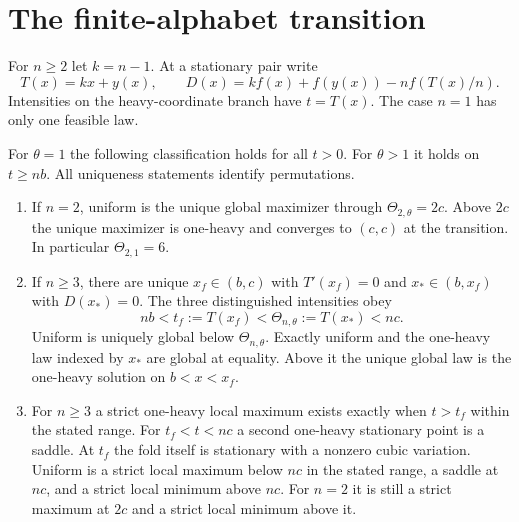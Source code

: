 \section{The finite-alphabet transition}
For $n\ge2$ let $k=n-1$. At a stationary pair write
\[
 T(x)=kx+y(x),\qquad
 D(x)=k f(x)+f(y(x))-n f(T(x)/n).
\]
Intensities on the heavy-coordinate branch have $t=T(x)$.
The case $n=1$ has only one feasible law.

\begin{theorem}\label{gtp:phase}
For $\theta=1$ the following classification holds for all $t>0$.
For $\theta>1$ it holds on $t\ge nb$. All uniqueness statements identify
permutations.
\begin{enumerate}
\item If $n=2$, uniform is the unique global maximizer through
$\Theta_{2,\theta}=2c$. Above $2c$ the unique maximizer is one-heavy and
converges to $(c,c)$ at the transition. In particular $\Theta_{2,1}=6$.
\item If $n\ge3$, there are unique $x_f\in(b,c)$ with $T'(x_f)=0$
and $x_*\in(b,x_f)$ with $D(x_*)=0$. The three distinguished intensities obey
\[
 nb<t_f:=T(x_f)<\Theta_{n,\theta}:=T(x_*)<nc .
\]
Uniform is uniquely global below $\Theta_{n,\theta}$. Exactly uniform and
the one-heavy law indexed by $x_*$ are global at equality. Above it the
unique global law is the one-heavy solution on $b<x<x_f$.
\item For $n\ge3$ a strict one-heavy local maximum exists exactly when $t>t_f$
within the stated range. For $t_f<t<nc$ a second one-heavy stationary point is a saddle.
At $t_f$ the fold itself is stationary with a nonzero cubic variation.
Uniform is a strict local maximum below $nc$ in the stated range,
a saddle at $nc$, and a strict local minimum above $nc$. For $n=2$ it
is still a strict maximum at $2c$ and a strict local minimum above it.
\end{enumerate}
\end{theorem}
